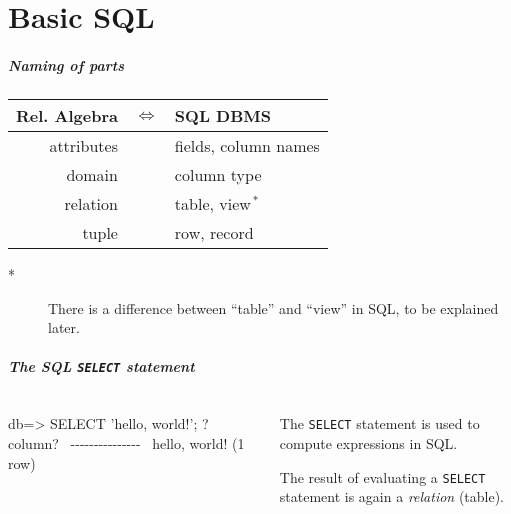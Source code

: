 \documentclass[english,serif,mathserif]{beamer}
\begin{document}
\part{Basic SQL}

\begin{frame}
  \frametitle{Naming of parts}

  \centering
  \begin{tabular}{rcl}
    \textbf{Rel. Algebra} &$\Leftrightarrow$& \textbf{SQL DBMS} \\
    \hline
    attributes            && fields, column names \\
    domain                && column type \\
    relation              && table, view${}^{\,*}$
    \\
    tuple                 && row, record \\
  \end{tabular}

  \+
  \smaller
  \raggedright
  \begin{description}
  \item[*] {%
    There is a difference between ``table'' and ``view'' in SQL,
    to be explained later.}
  \end{description}
\end{frame}


\begin{frame}[fragile]
  \frametitle{The SQL \texttt{SELECT} statement}
  \smaller

  \begin{columns}
    \begin{column}{0.5\linewidth}
\begin{sql}
db=> SELECT 'hello, world!';
   ?column?
~-{}-{}-{}-{}-{}-{}-{}-{}-{}-{}-{}-{}-{}-{}-{}~
 hello, world!
(1 row)
\end{sql}
    \end{column}
    \begin{column}{0.5\linewidth}
      The \texttt{SELECT} statement is used to compute expressions in SQL.

      \+ \alert<2>{The result of evaluating a \texttt{SELECT} statement is again a
      \emph{relation} (table).}

      \+
    \end{column}
  \end{columns}
\end{frame}
\end{document}
